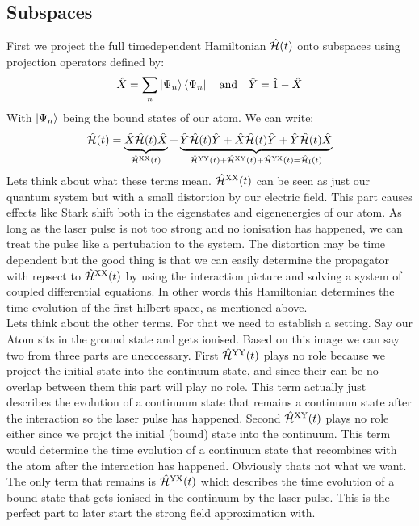 \subsection{Subspaces}
First we project the full timedependent Hamiltonian $\hat{\mathcal{H}}(t)$ onto subspaces using projection operators defined by:
\begin{equation*}
    \hat{X} = \sum_{n}\ket{\Psi_n}\bra{\Psi_n}\quad\text{and}\quad\hat{Y}= \hat{1} - \hat{X}
\end{equation*}
With $\ket{\Psi_n}$ being the bound states of our atom. We can write:
\begin{equation*}
    \hat{\mathcal{H}}(t) = \underbrace{\hat{X}\hat{\mathcal{H}}(t)\hat{X}}_{\hat{\mathcal{H}}^{\mathrm{XX}}(t)} + \underbrace{\hat{Y}\hat{\mathcal{H}}(t)\hat{Y} + \hat{X}\hat{\mathcal{H}}(t)\hat{Y} + \hat{Y}\hat{\mathcal{H}}(t)\hat{X}}_{\hat{\mathcal{H}}^{\mathrm{YY}}(t)+\hat{\mathcal{H}}^{\mathrm{XY}}(t)+\hat{\mathcal{H}}^{\mathrm{YX}}(t)=\hat{\mathcal{H}}_{\mathrm{I}}(t)}
\end{equation*}
Lets think about what these terms mean. $\hat{\mathcal{H}}^{\mathrm{XX}}(t)$ can be seen as just our quantum system but with a small distortion by our electric field. 
This part causes effects like Stark shift both in the eigenstates and eigenenergies of our atom. 
As long as the laser pulse is not too strong and no ionisation has happened, we can treat the pulse like a pertubation to the system.
The distortion may be time dependent but the good thing is that we can easily determine the propagator with repsect to $\hat{\mathcal{H}}^{\mathrm{XX}}(t)$ by using the interaction picture and solving a system of coupled differential equations.
In other words this Hamiltonian determines the time evolution of the first hilbert space, as mentioned above. \\
Lets think about the other terms. For that we need to establish a setting. Say our Atom sits in the ground state and gets ionised. 
Based on this image we can say two from three parts are uneccessary. First $\hat{\mathcal{H}}^{\mathrm{YY}}(t)$ plays no role because we project the initial state into the continuum state, and since their can be no overlap between them this part will play no role.
This term actually just describes the evolution of a continuum state that remains a continuum state after the interaction so the laser pulse has happened.
Second $\hat{\mathcal{H}}^{\mathrm{XY}}(t)$ plays no role either since we projct the initial (bound) state into the continuum. 
This term would determine the time evolution of a continuum state that recombines with the atom after the interaction has happened.
Obviously thats not what we want. 
The only term that remains is $\hat{\mathcal{H}}^{\mathrm{YX}}(t)$ which describes the time evolution of a bound state that gets ionised in the continuum by the laser pulse.
This is the perfect part to later start the strong field approximation with.\\










